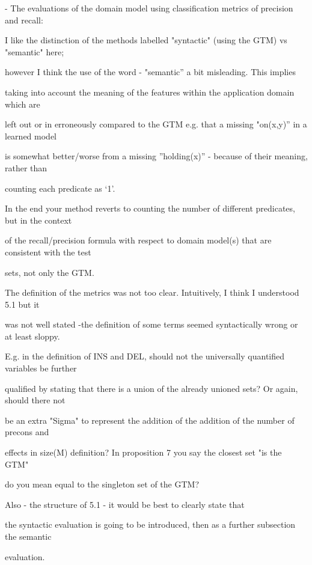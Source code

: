 \documentclass{article}
\begin{document}
\begin{mdframed}[hidealllines=true,backgroundcolor=gray!20]
  - The evaluations of the domain model using classification metrics of precision and recall:

I like the distinction of the methods labelled "syntactic" (using the GTM) vs "semantic" here;

however I think the use of the word - "semantic” a bit misleading. This implies

taking into account the meaning of the features within the application domain which are

left out or in erroneously compared to the GTM e.g. that a missing "on(x,y)” in a learned model

is somewhat better/worse from a missing ”holding(x)” - because of their meaning, rather than

counting each predicate as ‘1’.

In the end your method reverts to counting the number of different predicates, but in the context

of the recall/precision formula with respect to domain model(s) that are consistent with the test

sets, not only the GTM.



The definition of the metrics was not too clear. Intuitively, I think I understood 5.1 but it

was not well stated -the definition of some terms seemed syntactically wrong or at least sloppy.

E.g. in the definition of INS and DEL, should not the universally quantified variables be further

qualified by stating that there is a union of the already unioned sets? Or again, should there not

be an extra "Sigma" to represent the addition of the addition of the number of precons and

effects in size(M) definition?  In proposition 7 you say the closest set "is the GTM"

do you mean equal to the singleton set of the GTM?

Also - the structure of 5.1 - it would be best to clearly state that

the syntactic evaluation is going to be introduced, then as a further subsection the semantic

evaluation.
\end{mdframed}
\end{document}
